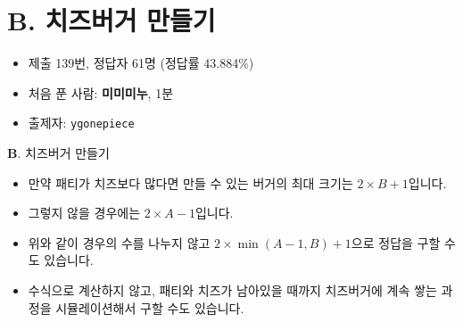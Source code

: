 \section{B. 치즈버거 만들기}

\begin{frame} %
    \begin{itemize}
        \item 제출 139번, 정답자 61명 (정답률 43.884\%)
        \item 처음 푼 사람: \textbf{미미미누}, 1분
        \item 출제자: \texttt{ygonepiece}
    \end{itemize}
\end{frame}

\begin{frame}{\textbf{B}. 치즈버거 만들기}
    \begin{itemize}
        \item 만약 패티가 치즈보다 많다면 만들 수 있는 버거의 최대 크기는 $2 \times B+1$입니다.
        \item 그렇지 않을 경우에는 $2 \times A-1$입니다.
        \item 위와 같이 경우의 수를 나누지 않고 $2 \times \min(A-1,B) + 1$으로 정답을 구할 수도 있습니다.
        \item 수식으로 계산하지 않고, 패티와 치즈가 남아있을 때까지 치즈버거에 계속 쌓는 과정을 시뮬레이션해서 구할 수도 있습니다.
    \end{itemize}
\end{frame}
